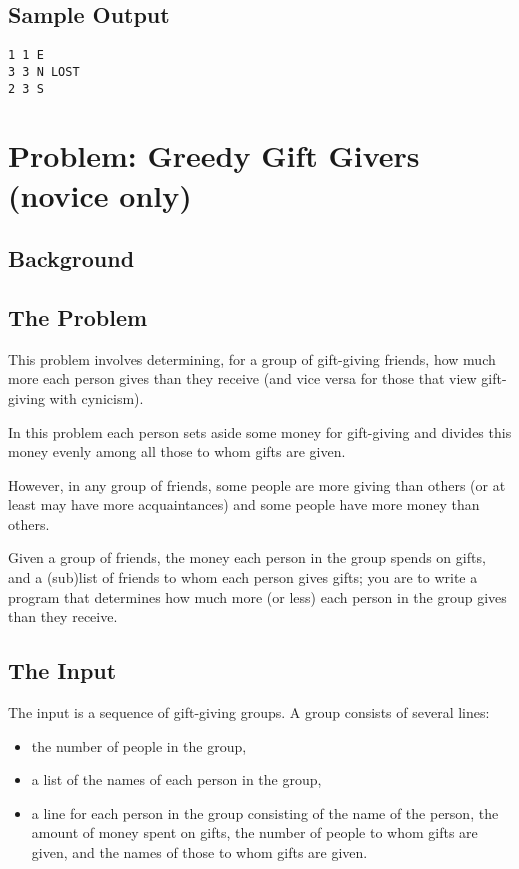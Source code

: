 \subsection*{Sample Output}
\begin{verbatim}
1 1 E
3 3 N LOST
2 3 S
\end{verbatim}

\clearpage

\section{Problem: Greedy Gift Givers (novice only)}

\subsection*{Background}


\subsection*{The Problem}

This problem involves determining, for a group of gift-giving friends,
how much more each person gives than they receive (and vice versa for
those that view gift-giving with cynicism).

In this problem each person sets aside some money for gift-giving and
divides this money evenly among all those to whom gifts are given.

However, in any group of friends, some people are more giving than
others (or at least may have more acquaintances) and some people have
more money than others.  

Given a group of friends, the money each person in the group spends on
gifts, and a (sub)list of friends to whom each person gives gifts; you
are to write a program that determines how much more (or less) each
person in the group gives than they receive.

\subsection*{The Input}
The input is a sequence of gift-giving groups.  
A group consists of several lines:
\begin{itemize}
\item the number of people in the group,
\item a list of the names of each person in the group,
\item a line for each person in the group consisting of
the name of the person,
the amount of money spent on gifts, the number of people to whom
gifts are given, and the names of those to whom gifts are given.
\end{itemize} 

